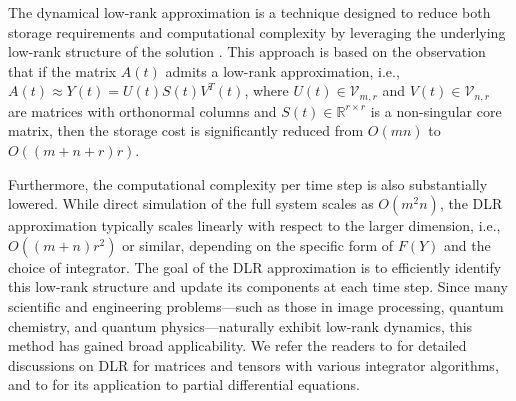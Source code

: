\documentclass[preprint,11pt]{elsarticle}
\begin{document}
The dynamical low-rank approximation is a technique designed to reduce both storage requirements and computational complexity by leveraging the underlying low-rank structure of the solution \cite{kochDynamicalLowRankApproximation2007}. This approach is based on the observation that if the matrix $A(t)$ admits a low-rank approximation, i.e., $A(t) \approx Y(t) = U(t)S(t)V^T(t)$, where $U(t) \in \mathcal{V}_{m,r}$ and $V(t) \in \mathcal{V}_{n,r}$ are matrices with orthonormal columns and $S(t) \in \mathbb{R}^{r \times r}$ is a non-singular core matrix, then the storage cost is significantly reduced from $O(mn)$ to $O((m+n+r)r)$. 

Furthermore, the computational complexity per time step is also substantially lowered. While direct simulation of the full system scales as $O(m^2n)$, the DLR approximation typically scales linearly with respect to the larger dimension, i.e., $O((m+n)r^2)$ or similar, depending on the specific form of $F(Y)$ and the choice of integrator. The goal of the DLR approximation is to efficiently identify this low-rank structure and update its components at each time step. Since many scientific and engineering problems—such as those in image processing, quantum chemistry, and quantum physics—naturally exhibit low-rank dynamics, this method has gained broad applicability. We refer the readers to %
\cite{kochDynamicalLowRankApproximation2007,kochDynamicalTensorApproximation2010,lubichDynamicalApproximationHierarchical2013}
for detailed discussions on DLR for matrices and tensors with various integrator algorithms, and to \cite{einkemmerLowRankProjectorSplittingIntegrator2018,einkemmerLowRankAlgorithmWeakly2019,ostermannConvergenceLowRankLieTrotter2019,einkemmerLowrankProjectorsplittingIntegrator2020} for its application to partial differential equations.
\end{document}
